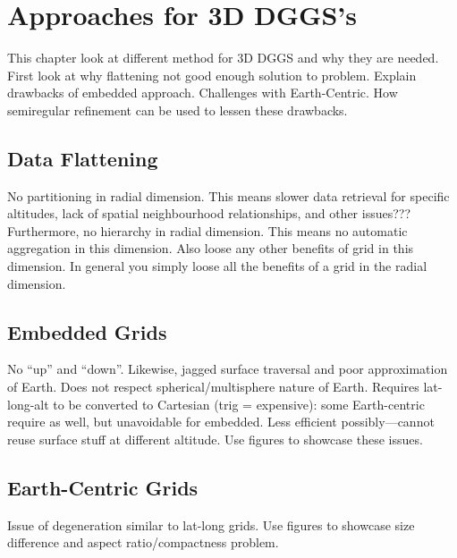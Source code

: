 \chapter{Approaches for 3D DGGS's} \label{chap:3ddggs}
This chapter look at different method for 3D DGGS and why they are needed.
First look at why flattening not good enough solution to problem.
Explain drawbacks of embedded approach.
Challenges with Earth-Centric.
How semiregular refinement can be used to lessen these drawbacks.


\section{Data Flattening}
No partitioning in radial dimension.
This means slower data retrieval for specific altitudes, lack of spatial neighbourhood relationships, and other issues???
Furthermore, no hierarchy in radial dimension.
This means no automatic aggregation in this dimension.
Also loose any other benefits of grid in this dimension.
In general you simply loose all the benefits of a grid in the radial dimension.


\section{Embedded Grids}
No ``up'' and ``down''.
Likewise, jagged surface traversal and poor approximation of Earth.
Does not respect spherical/multisphere nature of Earth.
Requires lat-long-alt to be converted to Cartesian (trig = expensive): some Earth-centric require as well, but unavoidable for embedded.
Less efficient possibly---cannot reuse surface stuff at different altitude.
Use figures to showcase these issues.


\section{Earth-Centric Grids}
Issue of degeneration similar to lat-long grids.
Use figures to showcase size difference and aspect ratio/compactness problem.


